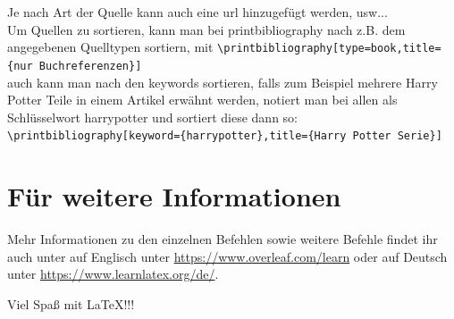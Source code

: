 \documentclass[ngerman]{scrreport}
\begin{document}
Je nach Art der Quelle kann auch eine url hinzugefügt werden, usw...\\
Um Quellen zu sortieren, kann man bei printbibliography nach z.B. dem angegebenen Quelltypen sortiern, mit {\color{blue}\verb|\printbibliography[type=book,title={nur Buchreferenzen}]|}\\
auch kann man nach den keywords sortieren, falls zum Beispiel mehrere Harry Potter Teile in einem Artikel erwähnt werden, notiert man bei allen als Schlüsselwort harrypotter und sortiert diese dann so: {\color{blue}\verb|\printbibliography[keyword={harrypotter},title={Harry Potter Serie}]|}\\

\section{Für weitere Informationen}
Mehr Informationen zu den einzelnen Befehlen sowie weitere Befehle findet ihr auch unter auf Englisch unter \url{https://www.overleaf.com/learn} oder auf Deutsch unter \url{https://www.learnlatex.org/de/}.
\vspace{2cm}

{\huge Viel Spaß mit \LaTeX{!!!}}

\printbibliography[title={Bücher}]
\end{document}
